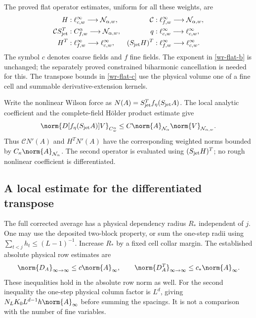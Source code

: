 The proved flat operator estimates, uniform for all these weights,
are
\begin{align}
 H &: \ell^\infty_{c,w}\longrightarrow\mathcal N_{\alpha,w},&
 \mathcal C &: \ell^\infty_{f,w}\longrightarrow\mathcal N_{\alpha,w},
                                                       \label{wr-flat-a}\\
 \mathcal C S_{\rm jet}^T &: C^\alpha_{f,w}\longrightarrow\mathcal N_{\alpha,w},
 &q &: \ell^\infty_{c,w}\longrightarrow\ell^\infty_{c,w},
                                                       \label{wr-flat-b}\\
 H^T &: \ell^\infty_{f,w}\longrightarrow\ell^\infty_{c,w},&
 (S_{\rm jet}H)^T &: \ell^\infty_{f,w}\longrightarrow\ell^\infty_{c,w}.
                                                       \label{wr-flat-c}
\end{align}
The symbol $c$ denotes coarse fields and $f$ fine fields.
The exponent in \eqref{wr-flat-b} is unchanged; the separately
proved constrained biharmonic cancellation is needed for this.
The transpose bounds in \eqref{wr-flat-c} use the physical volume
one of a fine cell and summable derivative-extension kernels.

Write the nonlinear Wilson force as
$N(A)=S_{\rm jet}^Tf_\eta(S_{\rm jet}A)$. The local analytic
coefficient and the complete-field H\"older product estimate give
\begin{equation}\label{wr-force}
 \norm{D[f_\eta(S_{\rm jet}A)]V}_{C^\alpha_w}
 \le C\norm{A}_{\mathcal N_\alpha}
                   \norm{V}_{\mathcal N_{\alpha,w}}.
\end{equation}
Thus $\mathcal C N'(A)$ and $H^TN'(A)$ have the corresponding
weighted norms bounded by $C_\kappa\norm{A}_{\mathcal N_\alpha}$.
The second operator is evaluated using $(S_{\rm jet}H)^T$;
no rough nonlinear coefficient is differentiated.

\subsection{A local estimate for the differentiated transpose}
\label{wr-local-transpose}

The full corrected average has a physical dependency radius
$R_*$ independent of $j$. One may use the deposited two-block
property, or sum the one-step radii using
$\sum_{t<j}h_t\le(L-1)^{-1}$. Increase $R_*$ by a fixed cell
collar margin. The established absolute physical row estimates are
\begin{equation}\label{wr-row-estimates}
 \norm{D_A}_{\infty\to\infty}\le c\norm{A}_\infty,
 \qquad
 \norm{D_A^T}_{\infty\to\infty}\le c_*\norm{A}_\infty.
\end{equation}
These inequalities hold in the absolute row norm as well.
For the second inequality the one-step physical column factor
is $L^d$, giving
$N_LK_0L^{d-1}h\norm{A}_\infty$ before summing the spacings.
It is not a comparison with the number of fine variables.

